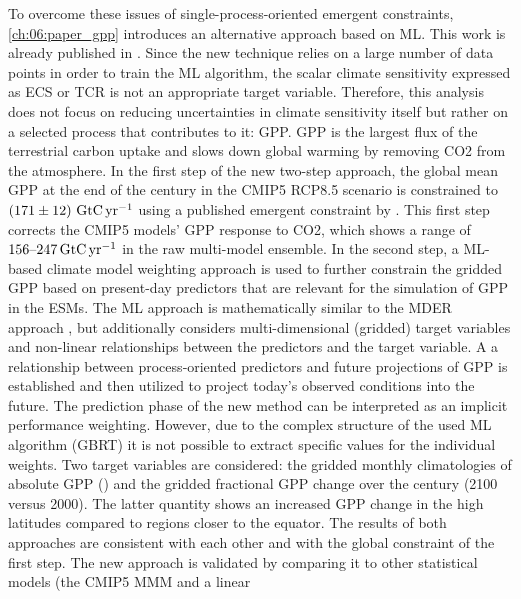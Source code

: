 To overcome these issues of single-process-oriented emergent constraints,
\cref{ch:06:paper_gpp} introduces an alternative approach based on \ac{ML}.
This work is already published in \textcite{Schlund2020}. Since the new
technique relies on a large number of data points in order to train the \ac{ML}
algorithm, the scalar climate sensitivity expressed as \ac{ECS} or \ac{TCR} is
not an appropriate target variable. Therefore, this analysis does not focus on
reducing uncertainties in climate sensitivity itself but rather on a selected
process that contributes to it: \ac{GPP}. \ac{GPP} is the largest flux of the
terrestrial carbon uptake and slows down global warming by removing \ac{CO2}
from the atmosphere. In the first step of the new two-step approach, the global
mean \ac{GPP} at the end of the  century in the \acs{CMIP}5
\acs{RCP}8.5 scenario is constrained to $\pmrangeunit{171}{12}{\GtCyr{}}$ using
a published emergent constraint by \textcite{Wenzel2016}. This first step
corrects the \acs{CMIP}5 models' \ac{GPP} response to \ac{CO2}, which shows a
range of $\rangeunit{156}{247}{\GtCyr{}}$ in the raw multi-model ensemble. In
the second step, a \ac{ML}-based climate model weighting approach is used to
further constrain the gridded \ac{GPP} based on present-day predictors that are
relevant for the simulation of \ac{GPP} in the \acp{ESM}. The \ac{ML} approach
is mathematically similar to the \ac{MDER} approach \autocite{Karpechko2013,
  Senftleben2020, Wenzel2016a}, but additionally considers multi-dimensional
(gridded) target variables and non-linear relationships between the predictors
and the target variable. A a relationship between process‐oriented predictors
and future projections of \ac{GPP} is established and then utilized to project
today's observed conditions into the future. The prediction phase of the new
method can be interpreted as an implicit performance weighting. However, due to
the complex structure of the used \ac{ML} algorithm (\ac{GBRT}) it is not
possible to extract specific values for the individual weights. Two target
variables are considered: the gridded monthly climatologies of absolute
\ac{GPP} () and the gridded fractional \ac{GPP} change over
the  century (2100 versus 2000). The latter quantity shows an increased
\acs{GPP} change in the high latitudes compared to regions closer to the
equator. The results of both approaches are consistent with each other and with
the global constraint of the first step. The new approach is validated by
comparing it to other statistical models (the \acs{CMIP}5 \ac{MMM} and a linear
